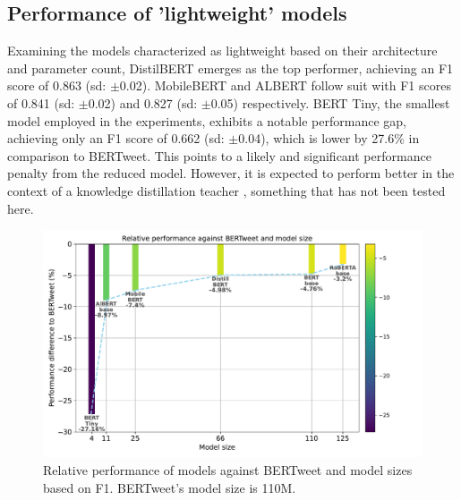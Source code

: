 \subsection{Performance of 'lightweight' models}
Examining the models characterized as lightweight based on their architecture and parameter count, DistilBERT emerges as the top performer, achieving an F1 score of 0.863 (sd: $\pm$0.02). MobileBERT and ALBERT follow suit with F1 scores of 0.841 (sd: $\pm$0.02) and 0.827 (sd: $\pm$0.05) respectively. BERT Tiny, the smallest model employed in the experiments, exhibits a notable performance gap, achieving only an F1 score of 0.662 (sd: $\pm$0.04), which is lower by 27.6\% in comparison to BERTweet. This points to a likely and significant performance penalty from the reduced model. However, it is expected to perform better in the context of a knowledge distillation teacher \cite{turcWellReadStudentsLearn2019}, something that has not been tested here.\\

\begin{figure}[htb]
    \centering
    \includegraphics[width=12cm]{figures/model_size_vs_perf.pdf}
    \vspace*{-3mm}
    \caption{Relative performance of models against BERTweet and model sizes based on F1. BERTweet's model size is 110M.}
    \label{fig: model_size_vs_perf}
\end{figure}

